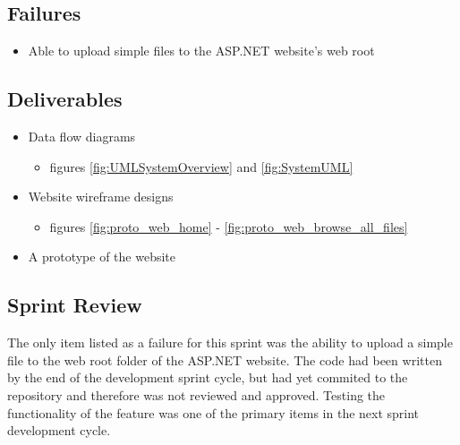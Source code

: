     \subsection{Failures}
    \label{sec:Sprint1_failures}
        \begin{itemize} 
            \item Able to upload simple files to the ASP.NET website's web root
        \end{itemize}

    \subsection{Deliverables}
    \label{sec:Sprint1_deliverables}
    \begin{itemize}
        \item Data flow diagrams
            \begin{itemize} \item figures \ref{fig:UMLSystemOverview} and \ref{fig:SystemUML} \end{itemize} 
        \item Website wireframe designs
            \begin{itemize} \item figures \ref{fig:proto_web_home} - \ref{fig:proto_web_browse_all_files} \end{itemize}         
        \item A prototype of the website
    \end{itemize}

    \subsection{Sprint Review}
    \label{sec:Sprint1_review}
        \hspace{7mm}
        The only item listed as a failure for this sprint was the ability to upload a simple file
        to the web root folder of the ASP.NET website.  The code had been written by the end of the 
        development sprint cycle, but had yet commited to the repository and therefore was not 
        reviewed and approved.  Testing the functionality of the feature was one of the primary 
        items in the next sprint development cycle.

